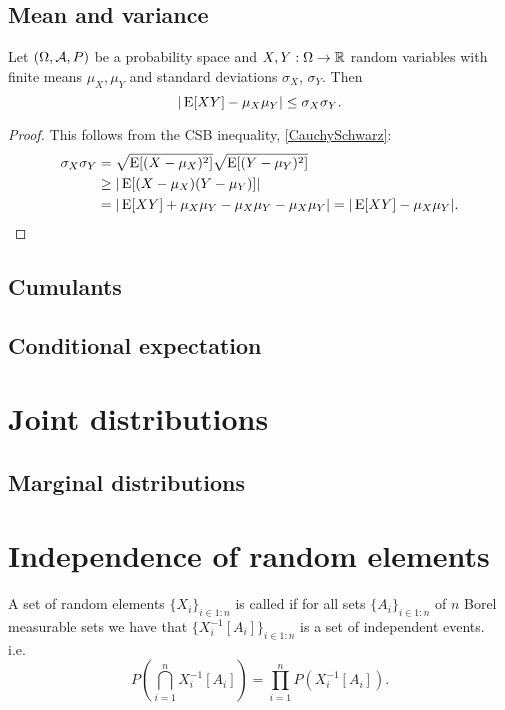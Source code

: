 \subsection{Mean and variance}

\begin{proposition}
Let $\sSet{\Omega, \mathcal{A}, P}$ be a probability space and $X,Y:\Omega \to \mathbb{R}$ random variables with finite means $\mu_X,\mu_Y$ and standard deviations $\sigma_X$, $\sigma_Y$. Then
\[ |\operatorname{E}[XY] - \mu_X\mu_Y| \leq \sigma_X\sigma_Y. \]
\end{proposition}
\begin{proof}
This follows from the CSB inequality, \ref{CauchySchwarz}:
\begin{align*}
\sigma_X\sigma_Y &= \sqrt{\operatorname{E}[(X-\mu_X)^2]}\sqrt{\operatorname{E}[(Y-\mu_Y)^2]} \\
&\geq |\operatorname{E}[(X-\mu_X)(Y-\mu_Y)]| \\
&= |\operatorname{E}[XY] + \mu_X\mu_Y -\mu_X\mu_Y -\mu_X\mu_Y| = |\operatorname{E}[XY] - \mu_X\mu_Y|.
\end{align*}
\end{proof}

\subsection{Cumulants}

\subsection{Conditional expectation}

\section{Joint distributions}
\subsection{Marginal distributions}

\section{Independence of random elements}
\begin{definition}
A set of random elements $\{X_i\}_{i\in 1:n}$ is called  if for all sets $\{A_i\}_{i\in 1:n}$ of $n$ Borel measurable sets we have that $\{X_i^{-1}[A_i]\}_{i\in 1:n}$ is a set of independent events. i.e.\
\[ P\left(\bigcap_{i=1}^n X_i^{-1}[A_i]\right) = \prod_{i=1}^n P(X_i^{-1}[A_i]). \]
\end{definition}

